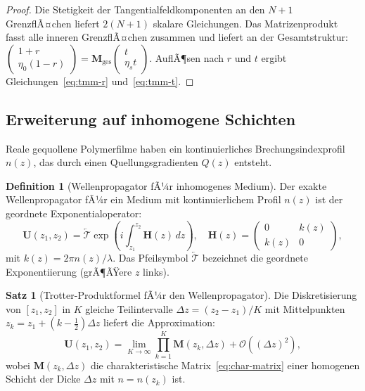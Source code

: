 ﻿\documentclass[a4paper,12pt]{article}
\theoremstyle{definition}
\newtheorem{definition}{Definition}[section]
\newtheorem{satz}{Satz}[section]
\newcommand{\ordre}[1]{\mathcal{O}\!\left(#1\right)}
\newcommand{\matr}[1]{\mathbf{#1}}
\begin{document}
	\begin{proof}
		Die Stetigkeit der Tangentialfeldkomponenten an den $N+1$ GrenzflÃ¤chen liefert
		$2(N+1)$ skalare Gleichungen. Das Matrizenprodukt fasst alle inneren
		GrenzflÃ¤chen zusammen und liefert an der Gesamtstruktur:
		$\begin{pmatrix}1 + r\\ \eta_0(1-r)\end{pmatrix}
		= \matr{M}_\mathrm{ges}\begin{pmatrix}t\\ \eta_s t\end{pmatrix}$.
		AuflÃ¶sen nach $r$ und $t$ ergibt Gleichungen~\eqref{eq:tmm-r}
		und~\eqref{eq:tmm-t}.
	\end{proof}
	
	\subsection{Erweiterung auf inhomogene Schichten}
	\label{ssec:tmm-inhomogen}
	
	Reale gequollene Polymerfilme haben ein kontinuierliches Brechungsindexprofil
	$n(z)$, das durch einen Quellungsgradienten $Q(z)$ entsteht.
	
	\begin{definition}[Wellenpropagator fÃ¼r inhomogenes Medium]
		\label{def:wellenpropagator}
		Der exakte Wellenpropagator fÃ¼r ein Medium mit kontinuierlichem Profil $n(z)$
		ist der geordnete Exponentialoperator:
		\begin{equation}
			\matr{U}(z_1, z_2) = \overleftarrow{\mathcal{T}} \exp\!\left(
			i \int_{z_1}^{z_2} \matr{H}(z)\, dz
			\right), \quad
			\matr{H}(z) = \begin{pmatrix} 0 & k(z) \\ k(z) & 0 \end{pmatrix},
			\label{eq:wellenpropagator}
		\end{equation}
		mit $k(z) = 2\pi n(z)/\lambda$. Das Pfeilsymbol $\overleftarrow{\mathcal{T}}$
		bezeichnet die geordnete Exponentiierung (grÃ¶ÃŸere $z$ links).
	\end{definition}
	
	\begin{satz}[Trotter-Produktformel fÃ¼r den Wellenpropagator]
		\label{satz:trotter}
		Die Diskretisierung von $[z_1, z_2]$ in $K$ gleiche Teilintervalle
		$\Delta z = (z_2-z_1)/K$ mit Mittelpunkten $z_k = z_1 + (k-\tfrac{1}{2})\Delta z$
		liefert die Approximation:
		\begin{equation}
			\matr{U}(z_1, z_2) = \lim_{K\to\infty} \prod_{k=1}^{K} \matr{M}(z_k, \Delta z)
			+ \ordre{(\Delta z)^2},
			\label{eq:trotter}
		\end{equation}
		wobei $\matr{M}(z_k, \Delta z)$ die charakteristische Matrix~\eqref{eq:char-matrix}
		einer homogenen Schicht der Dicke $\Delta z$ mit $n = n(z_k)$ ist.
	\end{satz}
	
\end{document}
